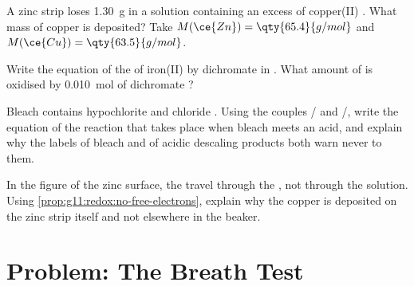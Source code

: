 \begin{exercise}[$\star\star\star$]\label{exo:g11:redox:12}
A zinc strip loses \qty{1.30}{g} in a solution containing an excess of
copper(II) . What mass of copper is deposited? Take
$M(\ce{Zn}) = \qty{65.4}{g/mol}$ and $M(\ce{Cu}) = \qty{63.5}{g/mol}$.
\end{exercise}

\begin{exercise}[$\star\star\star$]\label{exo:g11:redox:13}
Write the equation of the  of iron(II)  by dichromate 
in . What amount of  is oxidised by
\qty{0.010}{mol} of dichromate ?
\end{exercise}

\begin{exercise}[$\star\star\star$]\label{exo:g11:redox:14}
Bleach contains hypochlorite   and chloride 
. Using the couples / and /,
write the equation of the reaction that takes place when bleach meets an
acid, and explain why the labels of bleach and of acidic descaling
products both warn never to  them.
\end{exercise}

\begin{exercise}[$\star\star\star$]\label{exo:g11:redox:15}
In the figure of the zinc surface, the  travel through the
, not through the solution. Using \cref{prop:g11:redox:no-free-electrons},
explain why the copper is deposited on the zinc strip itself and not
elsewhere in the beaker.
\end{exercise}

\section{Problem: The Breath Test}


